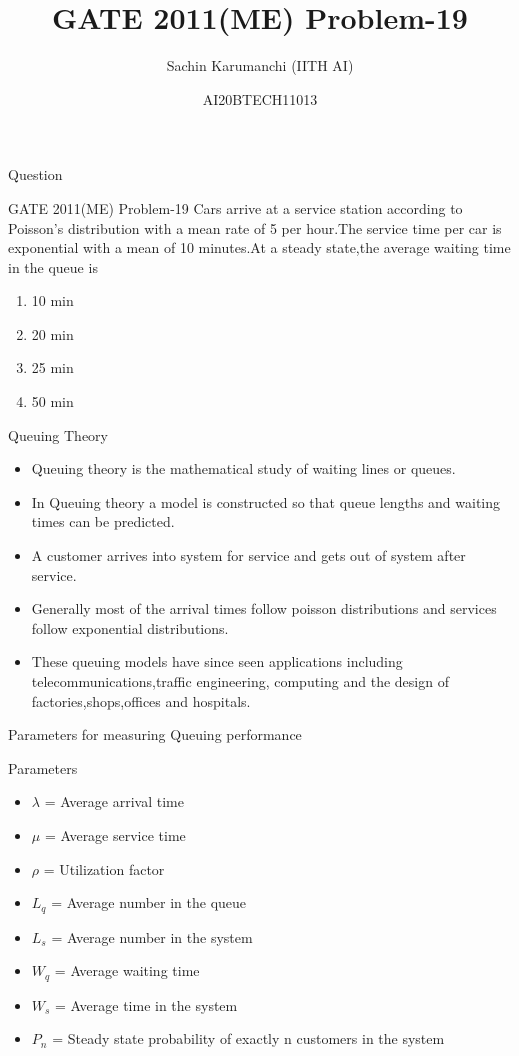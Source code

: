 \documentclass{beamer}
\title{GATE 2011(ME) Problem-19}
\author{Sachin Karumanchi (IITH AI)}
\date{AI20BTECH11013}
\begin{document}
%
\begin{frame}
\titlepage
\end{frame}
\begin{frame}{Question}
    \begin{block}{GATE 2011(ME) Problem-19}
    Cars arrive at a service station according to Poisson’s distribution with a mean rate of 5 per hour.The service time per car is exponential with a mean of 10 minutes.At a steady state,the average waiting time in the queue is
    \begin{enumerate}
        \item 10 min
        \item 20 min
        \item 25 min
        \item 50 min
    \end{enumerate}
    \end{block}
\end{frame}
\begin{frame}{Queuing Theory}
\begin{itemize}
    \item Queuing theory is the mathematical study of waiting lines or queues.
    \item In Queuing theory a model is constructed so that queue lengths and waiting times can be predicted.
    \item A customer arrives into system for service and gets out of system after service.
    \item Generally most of the arrival times follow poisson distributions and services follow exponential distributions.
    \item These queuing models have since seen applications including telecommunications,traffic engineering, computing and the design of factories,shops,offices and hospitals. 
\end{itemize}
\end{frame}
\begin{frame}{Parameters for measuring Queuing performance}
\begin{block}{Parameters}
\begin{itemize}
    \item $\lambda$ = Average arrival time
    \item $\mu$ = Average service time
    \item $\rho$ = Utilization factor
    \item $L_q$ = Average number in the queue
    \item $L_s$ = Average number in the system
    \item $W_q$ = Average waiting time
    \item $W_s$ = Average time in the system
    \item $P_n$ = Steady state probability of exactly n customers in the system
\end{itemize}
\end{block}
\end{frame}
\end{document}
